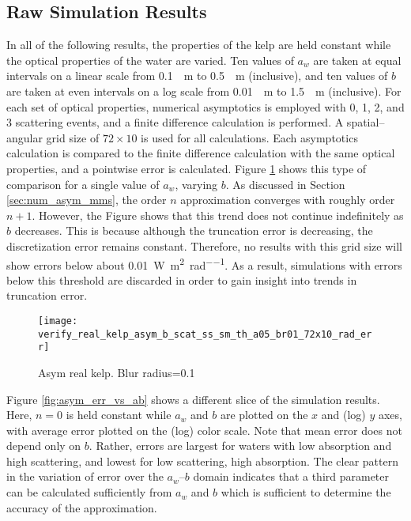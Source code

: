 \subsection{Raw Simulation Results}
\label{sec:iop_study_raw}
In all of the following results, the properties of the kelp are held constant while the optical properties of the water are varied.
Ten values of $a_w$ are taken at equal intervals on a linear scale from \SI{0.1}{\per\m} to \SI{0.5}{\per\m} (inclusive), and ten values of $b$ are taken at even intervals on a log scale from \SI{0.01}{\per\m} to \SI{1.5}{\per\m} (inclusive).
For each set of optical properties, numerical asymptotics is employed with 0, 1, 2, and 3 scattering events, and a finite difference calculation is performed.
A spatial--angular grid size of $72 \times 10$ is used for all calculations.
Each asymptotics calculation is compared to the finite difference calculation with the same optical properties, and a pointwise error is calculated.
Figure \ref{fig:asym_real_kelp_br01} shows this type of comparison for a single value of $a_w$, varying $b$.
As discussed in Section \ref{sec:num_asym_mms}, the order $n$ approximation converges with roughly order $n+1$.
However, the Figure shows that this trend does not continue indefinitely as $b$ decreases.
This is because although the truncation error is decreasing, the discretization error remains constant.
Therefore, no results with this grid size will show errors below about \SI{0.01}{\W\per\m\squared\per\radian}.
As a result, simulations with errors below this threshold are discarded in order to gain insight into trends in truncation error.

\newcommand\rdfigwidth{4.5in}

\begin{figure}[H]
  \centering
  \texttt{[image: verify\_real\_kelp\_asym\_b\_scat\_ss\_sm\_th\_a05\_br01\_72x10\_rad\_err]}
  \caption{Asym real kelp. Blur radius=0.1}
  \label{fig:asym_real_kelp_br01}
\end{figure}

Figure \ref{fig:asym_err_vs_ab} shows a different slice of the simulation results.
Here, $n=0$ is held constant while $a_w$ and $b$ are plotted on the $x$ and (log) $y$ axes, with average error plotted on the (log) color scale.
Note that mean error does not depend only on $b$.
Rather, errors are largest for waters with low absorption and high scattering, and lowest for low scattering, high absorption.
The clear pattern in the variation of error over the $a_w$--$b$ domain indicates that a third parameter can be calculated sufficiently from $a_w$ and $b$ which is sufficient to determine the accuracy of the approximation.


